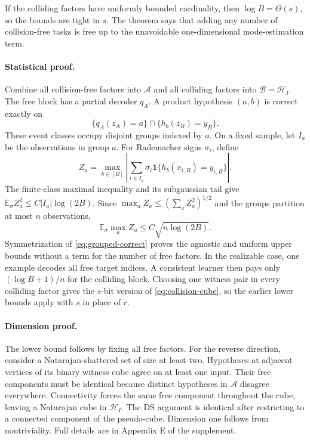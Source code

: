\documentclass[twoside]{article}
\newcommand{\E}{\mathbb E}
\begin{document}
If the colliding factors have uniformly bounded cardinality, then $\log B=\Theta(s)$, so the bounds are tight in $s$. The theorem says that adding any number of collision-free tasks is free up to the unavoidable one-dimensional mode-estimation term.

\paragraph{Statistical proof.} Combine all collision-free factors into $\mathcal A$ and all colliding factors into $\mathcal B=\mathcal H_I$. The free block has a partial decoder $q_A$. A product hypothesis $(a,b)$ is correct exactly on
\begin{equation}
 \{q_A(z_A)=a\}\cap\{h_b(z_B)=y_B\}.
 \label{eq:grouped-correct}
\end{equation}
These event classes occupy disjoint groups indexed by $a$. On a fixed sample, let $I_a$ be the observations in group $a$. For Rademacher signs $\sigma_i$, define \[ Z_a=\max_{b\in[B]} \left|\sum_{i\in I_a}\sigma_i \mathbf1\{h_b(x_{i,B})=y_{i,B}\}\right|. \] The finite-class maximal inequality and its subgaussian tail give $\E_\sigma Z_a^2\leq C|I_a|\log(2B)$. Since $\max_aZ_a\leq(\sum_aZ_a^2)^{1/2}$ and the groups partition at most $n$ observations, \[ \E_\sigma\max_a Z_a\leq C\sqrt{n\log(2B)}. \] Symmetrization of \eqref{eq:grouped-correct} proves the agnostic and uniform upper bounds without a term for the number of free factors. In the realizable case, one example decodes all free target indices. A consistent learner then pays only $(\log B+1)/n$ for the colliding block. Choosing one witness pair in every colliding factor gives the $s$-bit version of \eqref{eq:collision-cube}, so the earlier lower bounds apply with $s$ in place of $r$.

\paragraph{Dimension proof.} The lower bound follows by fixing all free factors. For the reverse direction, consider a Natarajan-shattered set of size at least two. Hypotheses at adjacent vertices of its binary witness cube agree on at least one input. Their free components must be identical because distinct hypotheses in $\mathcal A$ disagree everywhere. Connectivity forces the same free component throughout the cube, leaving a Natarajan cube in $\mathcal H_I$. The DS argument is identical after restricting to a connected component of the pseudo-cube. Dimension one follows from nontriviality. Full details are in Appendix E of the supplement.
\end{document}
